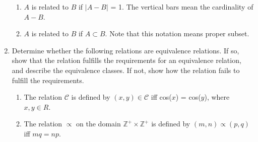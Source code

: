 \documentclass{article}
\newcommand{\Z}{\mathbb{Z}}
\begin{document}
\begin{enumerate}
\begin{enumerate}
    \item $A$ is related to $B$ if $\lvert A-B \rvert$ = 1. The 
    vertical bars mean the cardinality of $A - B$.
    \item $A$ is related to $B$ if $A \subset B$. Note 
    that this notation means proper subset.
\end{enumerate}


\item Determine whether the following relations are equivalence relations. 
If so, show that the relation fulfills the requirements for an equivalence relation, 
and describe the equivalence classes. If not, show how the relation fails to fulfill 
the requirements.

\begin{enumerate}
    \item The relation $\mathcal{C}$ is defined by $(x,y)\in \mathcal{C}$ iff cos($x$) = cos($y$), where $x,y \in R$.
    \item The relation $\varpropto$ on the domain $\Z^+\times\Z^+$ is defined by $(m,n) \varpropto (p,q)$ iff $mq = np$.
\end{enumerate}

\end{enumerate}
\end{document}
